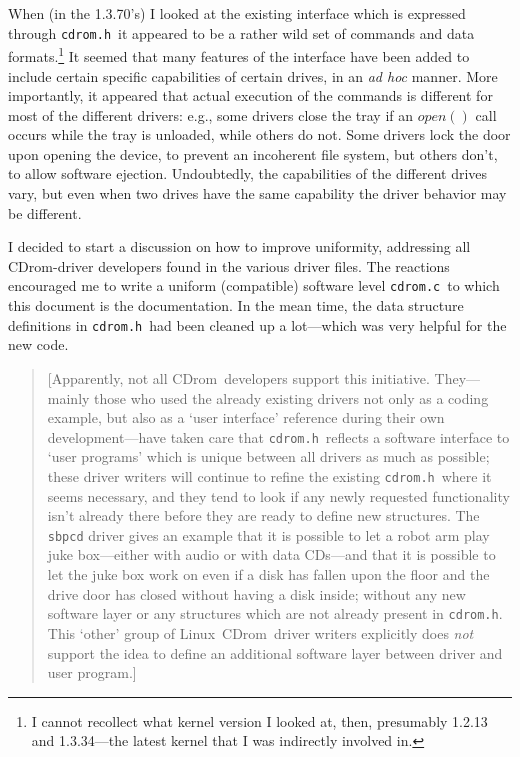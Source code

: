 \documentclass{article}
\def\linux{{\sc Linux}}
\def\cdrom{{\sc CDrom}}
\def\cdromc{{\tt cdrom.c}}
\def\cdromh{{\tt cdrom.h}}
\def\fo{\sl}
\begin{document}
When (in the 1.3.70's) I looked at the existing interface which is
expressed through \cdromh\ it appeared to be a rather wild set of
commands and data formats.\footnote{I cannot recollect what kernel
  version I looked at, then, presumably 1.2.13 and 1.3.34---the latest
  kernel that I was indirectly involved in.} It seemed that many
features of the interface have been added to include certain specific
capabilities of certain drives, in an {\fo ad hoc\/} manner. More
importantly, it appeared that actual execution of the commands is
different for most of the different drivers: e.g., some drivers close
the tray if an $open()$ call occurs while the tray is unloaded, while
others do not. Some drivers lock the door upon opening the device, to
prevent an incoherent file system, but others don't, to allow software
ejection.  Undoubtedly, the capabilities of the different drives vary,
but even when two drives have the same capability the driver behavior
may be different.

I decided to start a discussion on how to improve uniformity,
addressing all \cdrom-driver developers found in the various driver
files. The reactions encouraged me to write a uniform (compatible)
software level \cdromc\ to which this document is the documentation.
In the mean time, the data structure definitions in \cdromh\ had been
cleaned up a lot---which was very helpful for the new code.
 
\begin{quote}
\small
[Apparently, not all \cdrom\ developers support this initiative.
They---mainly those who used the already existing drivers not only as
a coding example, but also as a `user interface' reference during
their own development---have taken care that \cdromh\ reflects a
software interface to `user programs' which is unique between all
drivers as much as possible; these driver writers will continue to
refine the existing \cdromh\ where it seems necessary, and they tend
to look if any newly requested functionality isn't already there
before they are ready to define new structures. The {\tt sbpcd} driver
gives an example that it is possible to let a robot arm play juke
box---either with audio or with data CDs---and that it is possible to
let the juke box work on even if a disk has fallen upon the floor and
the drive door has closed without having a disk inside; without any
new software layer or any structures which are not already present in
\cdromh.  This `other' group of \linux\ \cdrom\ driver writers
explicitly does {\em not\/} support the idea to define an additional
software layer between driver and user program.]\parfillskip=0pt
\end{quote}
\end{document}
